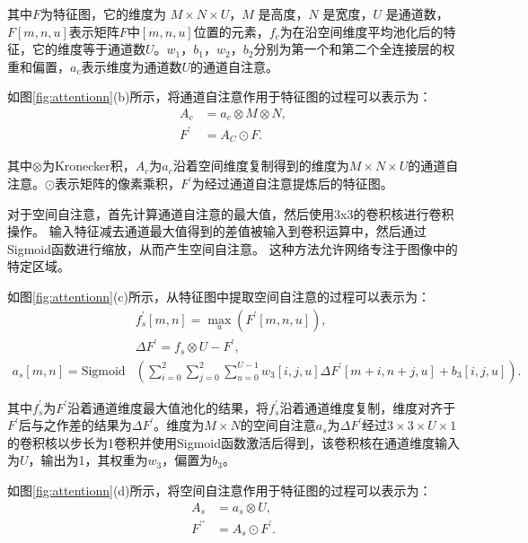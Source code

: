 \documentclass[
    type = master, %
    degree = academic,        %
    decl-page,  %
  ]{njuthesis}
\begin{document}
其中$F$为特征图，它的维度为 $M \times N \times U$，$M$ 是高度，$N$ 是宽度，$U$ 是通道数，$F[m,n,u]$表示矩阵$F$中$[m,n,u]$位置的元素，$f_c$为在沿空间维度平均池化后的特征，它的维度等于通道数$U$。$w_1$，$b_1$，$w_2$，$b_2$分别为第一个和第二个全连接层的权重和偏置，$a_c$表示维度为通道数$U$的通道自注意。

如图\ref{fig:attentionn}(b)所示，将通道自注意作用于特征图的过程可以表示为：
\begin{equation}
    \begin{align}
        A_c &= a_c\otimes M \otimes N,\\
        F^{\prime} &= A_C \odot F.
    \end{align}
\end{equation}

其中$\otimes$为Kronecker积，$A_c$为$a_c$沿着空间维度复制得到的维度为$M \times N \times U$的通道自注意。$\odot$表示矩阵的像素乘积，$F^{\prime}$为经过通道自注意提炼后的特征图。

对于空间自注意，首先计算通道自注意的最大值，然后使用3x3的卷积核进行卷积操作。 输入特征减去通道最大值得到的差值被输入到卷积运算中，然后通过Sigmoid函数进行缩放，从而产生空间自注意。 这种方法允许网络专注于图像中的特定区域。

如图\ref{fig:attentionn}(c)所示，从特征图中提取空间自注意的过程可以表示为：
\begin{equation}
    \begin{align*}
    &f^{\prime}_s[m,n] = \underset{u}{\operatorname{max}}(F^{\prime}[m,n,u]),\\
    &\Delta F^{\prime} = f_s \otimes U -F^{\prime},\\
    a_s[m,n] = \text{Sigmoid}&\left(\sum_{i=0}^{2} \sum_{j=0}^{2} \sum_{u=0}^{U-1}  w_3[i,j,u]\Delta F^{\prime}[m+i,n+j,u]+b_3[i,j,u]\right).
    \end{align*}
\end{equation}

其中$f^{\prime}_s$为$F^{\prime}$沿着通道维度最大值池化的结果，将$f^{\prime}_s$沿着通道维度复制，维度对齐于$F^{\prime}$后与之作差的结果为$\Delta F^{\prime}$。维度为$M\times N$的空间自注意$a_s$为$\Delta F^{\prime}$经过$3 \times 3 \times U \times 1$ 的卷积核以步长为1卷积并使用Sigmoid函数激活后得到，该卷积核在通道维度输入为$U$，输出为1，其权重为$w_3$，偏置为$b_3$。

如图\ref{fig:attentionn}(d)所示，将空间自注意作用于特征图的过程可以表示为：
\begin{equation}
    \begin{align}
        A_s &= a_s \otimes U, \\
        F^{\prime\prime} &= A_s \odot F^{\prime}.
    \end{align}
\end{equation}
\end{document}
